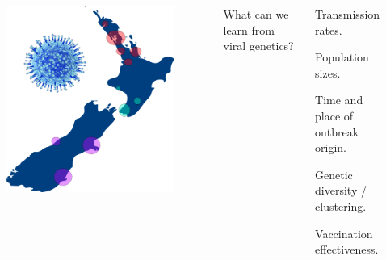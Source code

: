 \documentclass{beamer}
\begin{document}
\begin{frame}

\begin{columns}[c] %


\begin{figure}
\includegraphics[width=0.8\linewidth]{nz1.png}
\end{figure}

What can we learn from viral genetics?

\begin{itemize}
\scriptsize{
\item Transmission rates.
\item Population sizes.
\item Time and place of outbreak origin.
\item Genetic diversity / clustering.
\item Vaccination effectiveness.}
\end{itemize}



\end{columns}
\end{frame}
\end{document}
